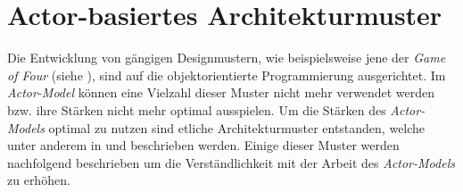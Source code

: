 \section{Actor-basiertes Architekturmuster}
\label{sec:theory:actorArchitecture}
Die Entwicklung von gängigen Designmustern, wie beispielsweise jene der \textit{Game of Four} (siehe \cite{gangOfFour1995design}), sind auf die objektorientierte Programmierung ausgerichtet. Im \textit{ Actor-Model} können eine Vielzahl dieser Muster nicht mehr verwendet werden bzw. ihre Stärken nicht mehr optimal ausspielen. Um die Stärken des \textit{ Actor-Models} optimal zu nutzen sind etliche Architekturmuster entstanden, welche unter anderem in \cite{Vernon2015ReactiveAkka} und \cite{kuhn2017reactive} beschrieben werden. Einige dieser Muster werden nachfolgend beschrieben um die Verständlichkeit mit der Arbeit des \textit{ Actor-Models} zu erhöhen.

